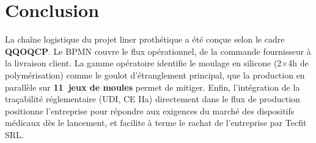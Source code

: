 
\section{Conclusion}

La chaîne logistique du projet liner prothétique a été conçue selon
le cadre \textbf{QQOQCP}. Le BPMN couvre le flux opérationnel, de la commande
fournisseur à la livraison client. La gamme opératoire identifie le moulage en
silicone (2$\times$4h de polymérisation) comme le goulot d'étranglement principal, que la
production en parallèle sur \textbf{11~jeux de moules} permet de mitiger. Enfin, l'intégration de la
traçabilité réglementaire (UDI, CE IIa) directement dans le flux de production positionne l'entreprise
pour répondre aux exigences du marché des dispositifs médicaux dès le lancement, et facilite à terme
le rachat de l'entreprise par Tecfit SRL.






